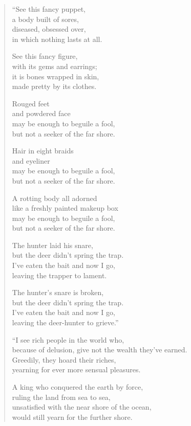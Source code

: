 \documentclass[12pt,openany]{book}%
\begin{document}
\begin{verse}%
“See this fancy puppet, \\
a body built of sores, \\
diseased, obsessed over, \\
in which nothing lasts at all. 

See this fancy figure, \\
with its gems and earrings; \\
it is bones wrapped in skin, \\
made pretty by its clothes. 

Rouged feet \\
and powdered face \\
may be enough to beguile a fool, \\
but not a seeker of the far shore. 

Hair in eight braids \\
and eyeliner \\
may be enough to beguile a fool, \\
but not a seeker of the far shore. 

A rotting body all adorned \\
like a freshly painted makeup box \\
may be enough to beguile a fool, \\
but not a seeker of the far shore. 

The hunter laid his snare, \\
but the deer didn’t spring the trap. \\
I’ve eaten the bait and now I go, \\
leaving the trapper to lament. 

The hunter’s snare is broken, \\
but the deer didn’t spring the trap. \\
I’ve eaten the bait and now I go, \\
leaving the deer-hunter to grieve.” 

“I see rich people in the world who, \\
because of delusion, give not the wealth they’ve earned. \\
Greedily, they hoard their riches, \\
yearning for ever more sensual pleasures. 

A king who conquered the earth by force, \\
ruling the land from sea to sea, \\
unsatisfied with the near shore of the ocean, \\
would still yearn for the further shore. 


\end{verse}
\end{document}
